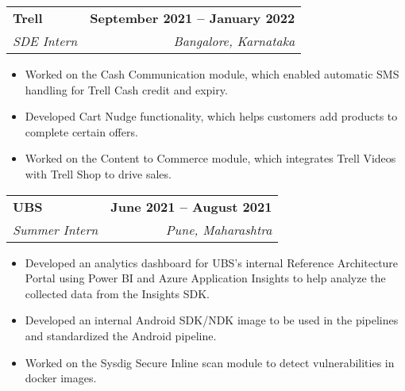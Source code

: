\documentclass[letterpaper,11pt]{article}
\makeatletter
\newcommand{\resumeItem}[1]{
  \item\small{
    {#1 \vspace{-2pt}}
  }
}
\newcommand{\resumeSubheading}[4]{
  \vspace{-2pt}\item
    \begin{tabular*}{1.0\textwidth}[t]{l@{\extracolsep{\fill}}r}
      \textbf{#1} & \textbf{\small #2} \\
      \textit{\small#3} & \textit{\small #4} \\
    \end{tabular*}\vspace{-7pt}
}
\newcommand{\resumeItemListStart}{\begin{itemize}}
\newcommand{\resumeItemListEnd}{\end{itemize}\vspace{-5pt}}
\makeatother
\begin{document}
    \resumeSubheading
      {Trell}{September 2021 -- January 2022}
      {SDE Intern}{Bangalore, Karnataka}
      \resumeItemListStart
        \resumeItem{Worked on the Cash Communication module, which enabled automatic SMS handling for Trell Cash credit and expiry.}
        \resumeItem{Developed Cart Nudge functionality, which helps customers add products to complete certain offers.}
        \resumeItem{Worked on the Content to Commerce module, which integrates Trell Videos with Trell Shop to drive sales.}
    \resumeItemListEnd

    \resumeSubheading
      {UBS}{June 2021 -- August 2021}
      {Summer Intern}{Pune, Maharashtra}
      \resumeItemListStart
        \resumeItem{Developed an analytics dashboard for UBS's internal Reference Architecture Portal using Power BI and Azure Application Insights to help analyze the collected data from the Insights SDK.}
        \resumeItem{Developed an internal Android SDK/NDK image to be used in the pipelines and standardized the Android pipeline.}
        \resumeItem{Worked on the Sysdig Secure Inline scan module to detect vulnerabilities in docker images.}
      \resumeItemListEnd
    
    
    
\end{document}
